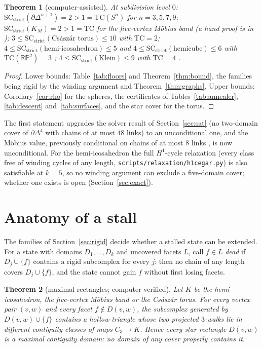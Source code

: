 \documentclass[12pt]{article}
\newcommand{\TC}{\mathrm{TC}}
\newcommand{\SC}{\mathrm{SC}}
\newcommand{\SCst}{\SC_{\mathrm{strict}}}
\newtheorem{theo}{Theorem}[section]
\begin{document}
\begin{theo}[computer-assisted]\label{thm:floors}
At subdivision level $0$:
$\SCst(\partial\Delta^{n+1})=2>1=\TC(S^n)$ for $n=3,5,7,9$;
$\SCst(K_M)=2>1=\TC$ for the five-vertex M\"obius band (a hand proof is in
\cite{PM26b});
$3\le\SCst(\text{Cs\'asz\'ar torus})\le10$ with $\TC=2$;
$4\le\SCst(\text{hemi-icosahedron})\le5$ and $4\le\SCst(\text{hemicube})\le6$
with $\TC(\mathbb{RP}^2)=3$ \cite{FTY03};
$4\le\SCst(\text{Klein})\le9$ with $\TC=4$ \cite{CV17}.
\end{theo}

\begin{proof}
Lower bounds: Table~\ref{tab:floors} and Theorem~\ref{thm:bound}, the
families being rigid by the winding argument and Theorem~\ref{thm:graphs}.
Upper bounds: Corollary~\ref{cor:rho} for the spheres, the certificates of
Tables~\ref{tab:annealer}, \ref{tab:descent} and~\ref{tab:surfaces}, and the
star cover for the torus.
\end{proof}

The first statement upgrades the solver result of Section~\ref{sec:sat}
(no two-domain cover of $\partial\Delta^4$ with chains of at most $48$
links) to an unconditional one, and the M\"obius value, previously
conditional on chains of at most $8$ links \cite{PM26}, is now
unconditional.  For the hemi-icosahedron the full $H^1$-cycle relaxation
(every class free of winding cycles of any length,
\texttt{scripts/relaxation/h1cegar.py}) is also satisfiable at $k=5$, so no
winding argument can exclude a five-domain cover; whether one exists is open
(Section~\ref{sec:exact}).

\section{Anatomy of a stall}\label{sec:stall}

The families of Section~\ref{sec:rigid} decide whether a stalled state can
be extended.  For a state with domains $D_1,\dots,D_k$ and uncovered facets
$L$, call $f\in L$ \emph{dead} if $D_j\cup\{f\}$ contains a rigid subcomplex
for every $j$: then no chain of any length covers $D_j\cup\{f\}$, and the
state cannot gain $f$ without first losing facets.

\begin{theo}[maximal rectangles; computer-verified]\label{thm:maximal}
Let $K$ be the hemi-icosahedron, the five-vertex M\"obius band or the
Cs\'asz\'ar torus.  For every vertex pair $(v,w)$ and every facet
$f\notin D(v,w)$, the subcomplex generated by $D(v,w)\cup\{f\}$ contains a
hollow triangle whose two projected $3$-walks lie in different contiguity
classes of maps $C_3\to K$.  Hence every star rectangle $D(v,w)$ is a
\emph{maximal} contiguity domain: no domain of any cover properly contains it.
\end{theo}
\end{document}
